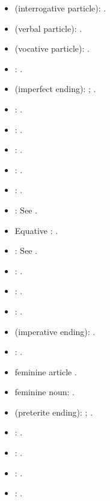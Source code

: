 \begin{itemize}
\item{} (interrogative particle): \textcite[§§~23, 196]{evans_grammar_1964}.
\item{} (verbal particle): \textcite[§§~23, 6, 192]{evans_grammar_1964}.
\item{} (vocative particle): \textcite[§~19]{evans_grammar_1964}.
\item{}: \textcite[§~20]{evans_grammar_1964}.
\item{} (imperfect ending): \textcite[§~21]{evans_grammar_1964}; \textcite[42--45]{van_development14}.
\item{}: \textcite[§~249]{evans_grammar_1964}.
\item{}: \textcite[§~20]{evans_grammar_1964}.
\item{}: \textcite[§~20]{evans_grammar_1964}.
\item{}: \textcite[§~20]{evans_grammar_1964}.
\item{}: \textcite[§~20]{evans_grammar_1964}.
\item{}: See .
\item Equative : \textcite[§§~22, 43]{evans_grammar_1964}.
\item{}: See .
\item{}: \textcite[§~20]{evans_grammar_1964}.
\item{}: \textcite[§~20]{evans_grammar_1964}.
\item{}: \textcite[§~20]{evans_grammar_1964}.
\item{} (imperative ending): \textcite[§~21]{evans_grammar_1964}.
\item{}: \textcite[§~20]{evans_grammar_1964}.
\item feminine article \textcite[§~19]{evans_grammar_1964}.
\item feminine noun: \textcite[§§~19, 22]{evans_grammar_1964}.
\item{} (preterite ending): \textcite[§~21]{evans_grammar_1964}; \textcite[50--51]{van_development14}.
\item{}: \textcite[§~20]{evans_grammar_1964}.
\item{}: \textcite[§~20]{evans_grammar_1964}.
\item{}: \textcite[§~20]{evans_grammar_1964}.
\item{}: \textcite[§~20]{evans_grammar_1964}.

\end{itemize}
